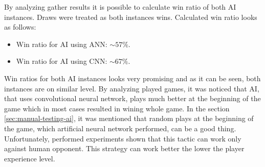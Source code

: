 By analyzing gather results it is possible to calculate win ratio of both AI instances. Draws were treated as both instances wins. Calculated win ratio looks as follows:
\begin{itemize}
    \item Win ratio for AI using ANN: $\sim 57\%$.
    \item Win ratio for AI using CNN: $\sim 67\%$.
\end{itemize}
Win ratios for both AI instances looks very promising and as it can be seen, both instances are on similar level. By analyzing played games, it was noticed that AI, that uses convolutional neural network, plays much better at the beginning of the game which in most cases resulted in wining whole game. In the section \ref{sec:manual-testing-ai}, it was mentioned that random plays at the beginning of the game, which artificial neural network performed, can be a good thing. Unfortunately, performed experiments shown that this tactic can work only against human opponent. This strategy can work better the lower the player experience level.



